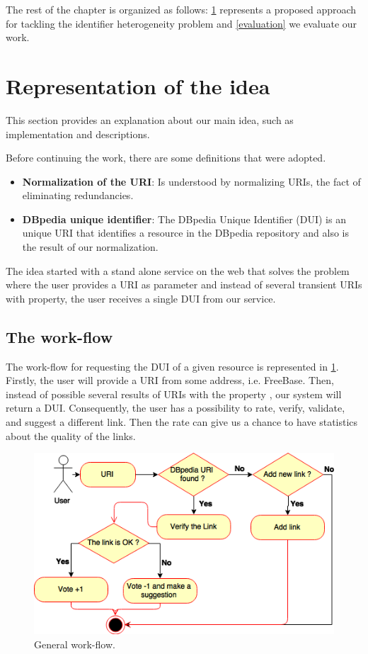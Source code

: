 The rest of the chapter is organized as follows: 
\cref{representationidea} represents a proposed approach for tackling the identifier heterogeneity problem and \cref{evaluation} we evaluate our work.


\section{Representation of the idea}\label{representationidea}

This section provides an explanation about our main idea, such as implementation and descriptions.

Before continuing the work, there are some definitions that were adopted.
\begin{itemize}
\item  \textbf{Normalization of the URI}: Is understood by normalizing URIs, the fact of eliminating redundancies.

\item \textbf{DBpedia unique identifier}: The DBpedia Unique Identifier (DUI) is an unique URI that identifies a resource in the DBpedia repository and also is the result of our normalization.
\end{itemize}

The idea started with a stand alone service on the web that solves the problem where the user provides a URI as parameter and instead of several transient URIs with  property, the user receives a single DUI from our service.

\subsection{The work-flow}
The work-flow for requesting the DUI of a given resource is represented in  \cref{fig:generalworkflow}.
Firstly, the user will provide a URI from some address, i.e. FreeBase. Then, instead of possible several results of URIs with the property , our system will return a DUI. Consequently, the user has a possibility to rate, verify, validate, and suggest a different link. Then the rate can give us a chance to have statistics about the quality of the links.

\begin{figure}[hbt] 
  	\centering
	\includegraphics[width=\columnwidth]{img/generalFlow.png}
 	\caption{General work-flow.}
  	\label{fig:generalworkflow}
\end{figure}

